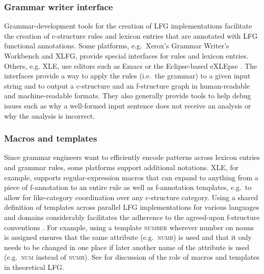\documentclass[output=paper,hidelinks]{langscibook}
\begin{document}
\subsubsection{Grammar writer interface} Grammar-development tools for the creation of LFG implementations facilitate the creation of  c-structure rules and lexicon entries that are annotated with LFG functional annotations. Some platforms, e.g.\ Xerox's Grammar Writer's Workbench and XLFG, provide special interfaces for rules and lexicon entries. Others, e.g. XLE, use editors such as Emacs or the Eclipse-based eXLEpse \citep{Radle2011eXLEp-30056}.  The interfaces provide a way to apply the rules (i.e.\ the grammar) to a given input string and to output a c-structure and an f-structure graph in  human-readable and machine-readable formats. They also generally provide tools to help debug issues such as why a well-formed input sentence does not receive an analysis or why the analysis is incorrect.
            
\subsubsection{Macros and templates}  Since grammar engineers want to efficiently encode patterns across lexicon entries and grammar rules, some platforms support additional notations. XLE, for example, supports regular-expression macros that can expand to anything from a piece of f-annotation to an entire rule as well as f-annotation templates, e.g.\ to allow for like-category coordination over any c-structure category. Using a shared definition of templates across parallel LFG implementations for various languages and domains considerably facilitates the adherence to the agreed-upon f-structure conventions \citep{King2005}. For example, using a template \@\textsc{number} wherever number on nouns is assigned ensures that the same attribute (e.g.\ \textsc{numb}) is used and that it only needs to be changed in one place if later another name of the attribute is used (e.g.\ \textsc{num} instead of \textsc{numb}). See  for discussion of the role of macros and templates in theoretical LFG.
        
\end{document}
